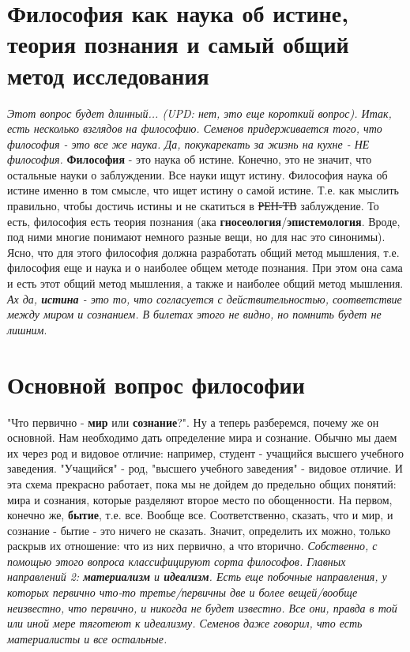 \section{Философия как наука об истине, теория познания и самый общий метод исследования}
\textit{Этот вопрос будет длинный... (UPD: нет, это еще короткий вопрос). Итак, есть несколько взглядов на философию. Семенов придерживается того, что философия - это все же наука. Да, покукарекать за жизнь на кухне - НЕ философия.} \textbf{Философия} - это наука об истине. Конечно, это не значит, что остальные науки о заблуждении. Все науки ищут истину. Философия наука об истине именно в том смысле, что ищет истину о самой истине. Т.е. как мыслить правильно, чтобы достичь истины и не скатиться в \sout{РЕН-ТВ} заблуждение. То есть, философия есть теория познания (ака \textbf{гносеология}/\textbf{эпистемология}. Вроде, под ними многие понимают немного разные вещи, но для нас это синонимы). Ясно, что для этого философия должна разработать общий метод мышления, т.е. философия еще и наука и о наиболее общем методе познания. При этом она сама и есть этот общий метод мышления, а также и наиболее общий метод мышления. \textit{Ах да, \textbf{истина} - это то, что согласуется с действительностью, соответствие между миром и сознанием. В билетах этого не видно, но помнить будет не лишним}. 

\section{Основной вопрос философии}
"Что первично - \textbf{мир} или \textbf{сознание}?". Ну а теперь разберемся, почему же он основной. Нам необходимо дать определение мира и сознание. Обычно мы даем их через род и видовое отличие: например, студент - учащийся высшего учебного заведения. "Учащийся" - род, "высшего учебного заведения" - видовое отличие. И эта схема прекрасно работает, пока мы не дойдем до предельно общих понятий: мира и сознания, которые разделяют второе место по обощенности. На первом, конечно же, \textbf{бытие}, т.е. все. Вообще все. Соответственно, сказать, что и мир, и сознание - бытие - это ничего не сказать. Значит, определить их можно, только раскрыв их отношение: что из них первично, а что вторично. \textit{Собственно, с помощью этого вопроса классифицируют сорта философов. Главных направлений 2: \textbf{материализм} и \textbf{идеализм}. Есть еще побочные направления, у которых первично что-то третье/первичны две и более вещей/вообще неизвестно, что первично, и никогда не будет известно. Все они, правда в той или иной мере тяготеют к идеализму. Семенов даже говорил, что есть материалисты и все остальные.}


